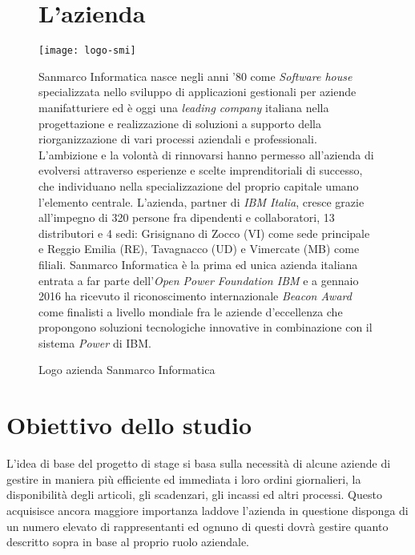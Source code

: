 \begin{figure}[h!]
\section{L'azienda}
   \begin{center}
    \texttt{[image: logo-smi]}
    \caption{Logo azienda Sanmarco Informatica}
    \end{center}
    Sanmarco Informatica nasce negli anni '80 come \textit{Software house} specializzata nello sviluppo di applicazioni gestionali per aziende manifatturiere ed è oggi una \textit{leading company} italiana nella progettazione e realizzazione di soluzioni a supporto della riorganizzazione di vari processi aziendali e professionali. L'ambizione e la volontà di rinnovarsi hanno permesso all'azienda di evolversi attraverso esperienze  e scelte imprenditoriali di successo, che individuano nella specializzazione del proprio capitale umano l'elemento centrale. L'azienda, partner di \textit{IBM Italia}, cresce grazie all'impegno di 320 persone fra dipendenti e collaboratori, 13 distributori e 4 sedi: Grisignano di Zocco (VI) come sede principale e Reggio Emilia (RE), Tavagnacco (UD) e Vimercate (MB) come filiali.
Sanmarco Informatica è la prima ed unica azienda italiana entrata a far parte dell'\textit{Open Power Foundation IBM} e a gennaio 2016 ha ricevuto il riconoscimento internazionale \textit{Beacon Award} come finalisti a livello mondiale fra le aziende d'eccellenza che propongono soluzioni tecnologiche innovative in combinazione con il sistema \textit{Power} di IBM.

    \end{figure}
    







\section{Obiettivo dello studio}



L'idea di base del progetto di stage si basa sulla necessità di alcune aziende di gestire in maniera più efficiente ed immediata i loro ordini giornalieri, la disponibilità degli articoli, gli scadenzari, gli incassi ed altri processi. Questo acquisisce ancora maggiore importanza laddove l'azienda in questione disponga di un numero elevato di rappresentanti ed ognuno di questi dovrà gestire quanto descritto sopra in base al proprio ruolo aziendale. 

